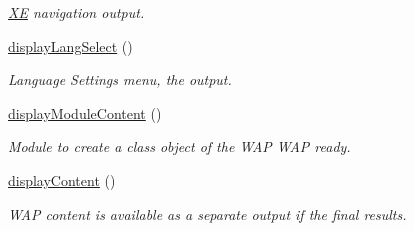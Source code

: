 \begin{DoxyCompactItemize}
\begin{DoxyCompactList}\small\item\em \hyperlink{namespaceXE}{XE} navigation output. \end{DoxyCompactList}\item 
\hyperlink{classmobileXE_aaed5eaefceeffc2a3509ae5d297bc379}{display\+Lang\+Select} ()
\begin{DoxyCompactList}\small\item\em Language Settings menu, the output. \end{DoxyCompactList}\item 
\hyperlink{classmobileXE_a37f91cc176cd83a7816680a8be49f2ba}{display\+Module\+Content} ()
\begin{DoxyCompactList}\small\item\em Module to create a class object of the W\+AP W\+AP ready. \end{DoxyCompactList}\item 
\hyperlink{classmobileXE_a755b22d15673cc9c172e1506b4e73418}{display\+Content} ()
\begin{DoxyCompactList}\small\item\em W\+AP content is available as a separate output if the final results. \end{DoxyCompactList}\end{DoxyCompactItemize}

